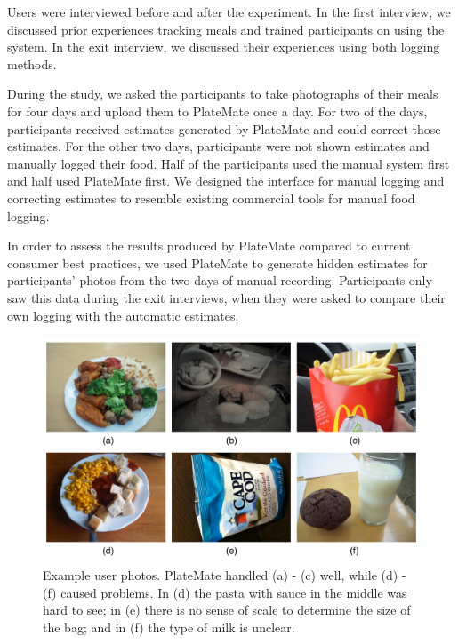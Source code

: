 Users were interviewed before and after the experiment. In the first interview, we discussed prior experiences tracking meals and trained participants on using the system. In the exit interview, we discussed their experiences using both logging methods.  

During the study, we asked the participants to take photographs of their meals for four days and upload them to PlateMate once a day.  For two of the days, participants received estimates generated by PlateMate and could correct those estimates.  For the other two days, participants were not shown estimates and manually logged their food.  Half of the participants used the manual system first and half used PlateMate first.  We designed the interface for manual logging and correcting estimates to resemble existing commercial tools for manual food logging.

In order to assess the results produced by PlateMate compared to current consumer best practices, we used PlateMate to generate hidden estimates for participants' photos from the two days of manual recording.  Participants only saw this data during the exit interviews, when they were asked to compare their own logging with the automatic estimates.

\begin{figure}
\begin{center}
   \includegraphics[width=\columnwidth]{figs/userphotos.pdf}
   \caption{Example user photos.  PlateMate handled (a) - (c) well, while (d) - (f) caused problems.  In (d) the pasta with sauce in the middle was hard to see; in (e) there is no sense of scale to determine the size of the bag; and in (f) the type of milk is unclear.}
   \label{fig:userPhotos}
\end{center}
\end{figure}

